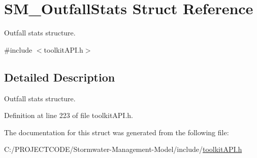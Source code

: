 \hypertarget{struct_s_m___outfall_stats}{}\section{S\+M\+\_\+\+Outfall\+Stats Struct Reference}
\label{struct_s_m___outfall_stats}


Outfall stats structure.  




{\ttfamily \#include $<$toolkit\+A\+P\+I.\+h$>$}



\subsection{Detailed Description}
Outfall stats structure. 

Definition at line 223 of file toolkit\+A\+P\+I.\+h.



The documentation for this struct was generated from the following file\+:\begin{DoxyCompactItemize}
\item 
C\+:/\+P\+R\+O\+J\+E\+C\+T\+C\+O\+D\+E/\+Stormwater-\/\+Management-\/\+Model/include/\hyperlink{toolkit_a_p_i_8h}{toolkit\+A\+P\+I.\+h}\end{DoxyCompactItemize}

